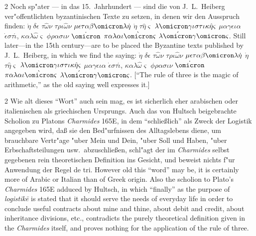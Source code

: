\documentclass[10pt,a4paper]{article}
\renewcommand{\switchcolumn}{\syncronize\nointerlineskip\columnbreak}
\newcommand{\enquote}[1]{``#1''}
\begin{document}
\begin{paracol}{2}
Noch sp"ater --- in das 15.\ Jahrhundert --- sind die von J.\ L.\ Heiberg ver"offentlichten byzantinischen Texte zu setzen, in denen wir den Ausspruch finden: $\dot{\eta}$ $\delta\epsilon$ $\tau\hat{\omega}\nu$ $\tau\rho\iota\hat{\omega}\nu$ $\mu\epsilon\tau\alpha\beta\omicron\lambda\dot{\eta}$ $\dot{\eta}$ $\tau\hat{\eta}\varsigma$ $\lambda\omicron\gamma\iota\sigma\tau\iota\kappa\hat{\eta}\varsigma$ $\mu\alpha\gamma\epsilon\iota\alpha$ $\dot{\epsilon}\sigma\tau\acute{\iota}$, $\kappa\alpha\lambda\hat{\omega}\varsigma$ $\phi\rho\alpha\sigma\iota\nu$ $\dot{\omicron}$ $\pi\alpha\lambda\alpha\iota\grave{\omicron}\varsigma$ $\lambda\acute{\omicron}\gamma\omicron\varsigma$.
\switchcolumn
Still later---in the 15th century---are to be placed the Byzantine texts published by J.\ L.\ Heiberg, in which we find the saying: $\dot{\eta}$ $\delta\epsilon$ $\tau\hat{\omega}\nu$ $\tau\rho\iota\hat{\omega}\nu$ $\mu\epsilon\tau\alpha\beta\omicron\lambda\dot{\eta}$ $\dot{\eta}$ $\tau\hat{\eta}\varsigma$ $\lambda\omicron\gamma\iota\sigma\tau\iota\kappa\hat{\eta}\varsigma$ $\mu\alpha\gamma\epsilon\iota\alpha$ $\dot{\epsilon}\sigma\tau\acute{\iota}$, $\kappa\alpha\lambda\hat{\omega}\varsigma$ $\phi\rho\alpha\sigma\iota\nu$ $\dot{\omicron}$ $\pi\alpha\lambda\alpha\iota\grave{\omicron}\varsigma$ $\lambda\acute{\omicron}\gamma\omicron\varsigma$. [``The rule of three is the magic of arithmetic,'' as the old saying well expresses it.]
\end{paracol}

\begin{paracol}{2}
Wie alt dieses \enquote{Wort} auch sein mag, es ist sicherlich eher arabischen oder italienischen als griechischen Ursprungs. Auch das von Hultsch beigebrachte Scholion zu Platons \textit{Charmides} 165E, in dem \enquote{schlie\ss{}lich} als Zweck der Logistik angegeben wird, da\ss{} sie den Bed"urfnissen des Alltagslebens diene, um brauchbare Vertr"age "uber Mein und Dein, "uber Soll und Haben, "uber Erbschaftsteilungen usw.\ abzuschlie\ss{}en, schl"agt der im \textit{Charmides} selbst gegebenen rein theoretischen Definition ins Gesicht, und beweist nichts f"ur Anwendung der Regel de tri.
\switchcolumn
However old this ``word'' may be, it is certainly more of Arabic or Italian than of Greek origin. Also the scholion to Plato's \textit{Charmides} 165E adduced by Hultsch, in which ``finally'' as the purpose of \textit{logistik\=e} is stated that it should serve the needs of everyday life in order to conclude useful contracts about mine and thine, about debit and credit, about inheritance divisions, etc., contradicts the purely theoretical definition given in the \textit{Charmides} itself, and proves nothing for the application of the rule of three.
\end{paracol}
\end{document}

